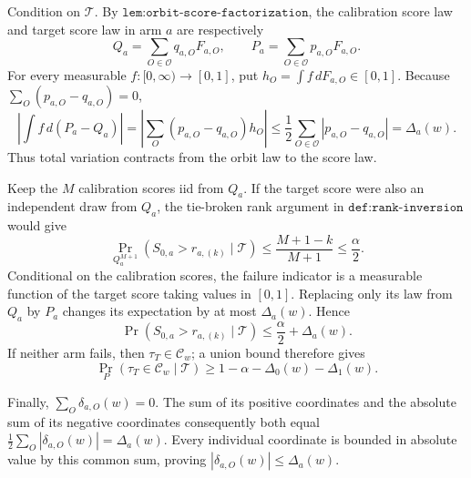 Condition on \(\mathcal T\). By \(\texttt{lem:orbit-score-factorization}\), the calibration score law and target score law in arm \(a\) are respectively \[Q_a=\sum_{O\in\mathcal O}q_{a,O}F_{a,O},\qquad P_a=\sum_{O\in\mathcal O}p_{a,O}F_{a,O}.\] For every measurable \(f:[0,\infty)\to[0,1]\), put \(h_O=\int f\,dF_{a,O}\in[0,1]\). Because \(\sum_O(p_{a,O}-q_{a,O})=0\), \[\left|\int f\,d(P_a-Q_a)\right|=\left|\sum_O(p_{a,O}-q_{a,O})h_O\right|\le\frac12\sum_{O\in\mathcal O}|p_{a,O}-q_{a,O}|=\Delta_a(w).\] Thus total variation contracts from the orbit law to the score law.

Keep the \(M\) calibration scores iid from \(Q_a\). If the target score were also an independent draw from \(Q_a\), the tie-broken rank argument in \(\texttt{def:rank-inversion}\) would give \[\Pr_{Q_a^{M+1}}(S_{0,a}>r_{a,(k)}\mid\mathcal T)\le\frac{M+1-k}{M+1}\le\frac\alpha2.\] Conditional on the calibration scores, the failure indicator is a measurable function of the target score taking values in \([0,1]\). Replacing only its law from \(Q_a\) by \(P_a\) changes its expectation by at most \(\Delta_a(w)\). Hence \[\Pr(S_{0,a}>r_{a,(k)}\mid\mathcal T)\le\frac\alpha2+\Delta_a(w).\] If neither arm fails, then \(\tau_T\in\mathcal C_w\); a union bound therefore gives \[\Pr_P(\tau_T\in\mathcal C_w\mid\mathcal T)\ge1-\alpha-\Delta_0(w)-\Delta_1(w).\]

Finally, \(\sum_O\delta_{a,O}(w)=0\). The sum of its positive coordinates and the absolute sum of its negative coordinates consequently both equal \(\tfrac12\sum_O|\delta_{a,O}(w)|=\Delta_a(w)\). Every individual coordinate is bounded in absolute value by this common sum, proving \(|\delta_{a,O}(w)|\le\Delta_a(w)\).
